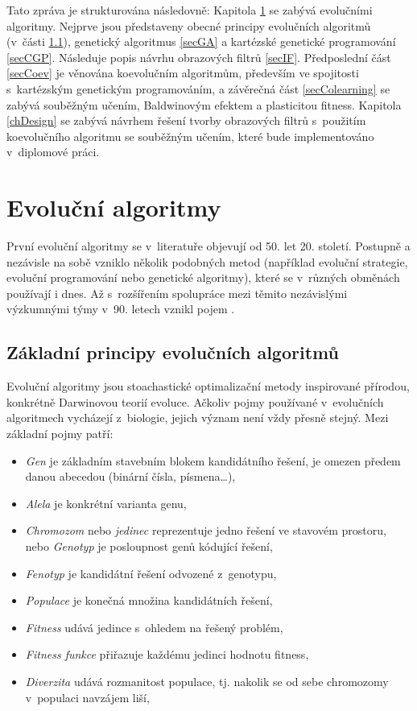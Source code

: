 Tato zpráva je strukturována následovně: Kapitola \ref{chEA} se zabývá evolučními algoritmy. Nejprve jsou představeny obecné principy evolučních algoritmů (v~části \ref{secEAGeneral}), genetický algoritmus \ref{secGA} a kartézské genetické programování \ref{secCGP}. Následuje popis návrhu obrazových filtrů \ref{secIF}. Předposlední část \ref{secCoev} je věnována koevolučním algoritmům, především ve spojitosti s~kartézským genetickým programováním, a závěrečná část \ref{secColearning} se zabývá souběžným učením, Baldwinovým efektem a plasticitou fitness. Kapitola \ref{chDesign} se zabývá návrhem řešení tvorby obrazových filtrů s~použitím koevolučního algoritmu se souběžným učením, které bude implementováno v~diplomové práci.

\chapter{Evoluční algoritmy}
\label{chEA}

První evoluční algoritmy se v~literatuře objevují od 50. let 20. století. Postupně a nezávisle na sobě vzniklo několik podobných metod (například evoluční strategie, evoluční programování nebo genetické algoritmy), které se v~různých obměnách používají i dnes. Až s~rozšířením spolupráce mezi těmito nezávislými výzkumnými týmy v~90. letech vznikl pojem  \cite{Modra}.

\section{Základní principy evolučních algoritmů}
\label{secEAGeneral}

Evoluční algoritmy jsou stoachastické optimalizační metody inspirované přírodou, konkrétně Darwinovou teorií evoluce. Ačkoliv pojmy používané v~evolučních algoritmech vycházejí z~biologie, jejich význam není vždy přesně stejný. Mezi základní pojmy patří:

\begin{itemize}
    \item\emph{Gen} je základním stavebním blokem kandidátního řešení, je omezen předem danou abecedou (binární čísla, písmena\ldots),
    \item\emph{Alela} je konkrétní varianta genu,
    \item\emph{Chromozom} nebo \emph{jedinec} reprezentuje jedno řešení ve stavovém prostoru,
    nebo \emph{Genotyp} je posloupnost genů kódující řešení,
    \item\emph{Fenotyp} je kandidátní řešení odvozené z~genotypu,
    \item\emph{Populace} je konečná množina kandidátních řešení,
    \item\emph{Fitness} udává  jedince s~ohledem na řešený problém,
    \item\emph{Fitness funkce} přiřazuje každému jedinci hodnotu fitness,
    \item\emph{Diverzita} udává rozmanitost populace, tj. nakolik se od sebe chromozomy v~populaci navzájem liší,
\end{itemize}

